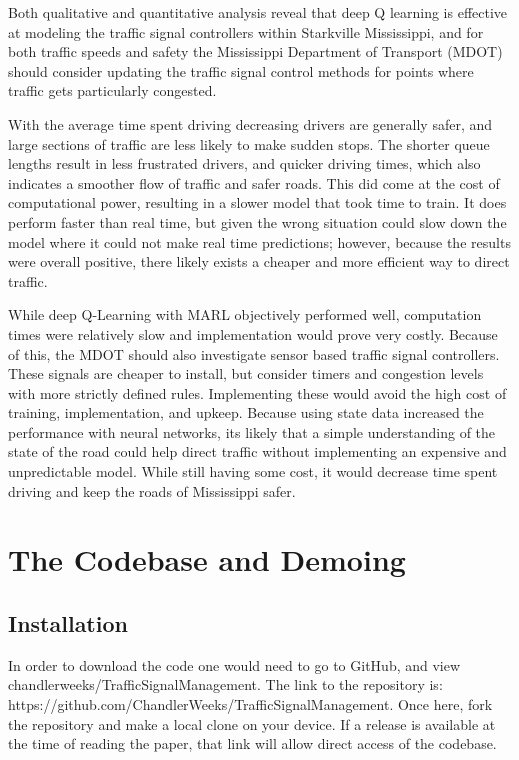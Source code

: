 \documentclass[conference]{IEEEtran}
\begin{document}
Both qualitative and quantitative analysis reveal that deep Q learning is effective at modeling the traffic signal controllers within Starkville Mississippi, and for both traffic speeds and safety the Mississippi Department of Transport (MDOT) should consider updating the traffic signal control methods for points where traffic gets particularly congested. 

With the average time spent driving decreasing drivers are generally safer, and large sections of traffic are less likely to make sudden stops. The shorter queue lengths result in less frustrated drivers, and quicker driving times, which also indicates a smoother flow of traffic and safer roads. This did come at the cost of computational power, resulting in a slower model that took time to train. It does perform faster than real time, but given the wrong situation could slow down the model where it could not make real time predictions; however, because the results were overall positive, there likely exists a cheaper and more efficient way to direct traffic. 

While deep Q-Learning with MARL objectively performed well, computation times were relatively slow and implementation would prove very costly. Because of this, the MDOT should also investigate sensor based traffic signal controllers. These signals are cheaper to install, but consider timers and congestion levels with more strictly defined rules. Implementing these would avoid the high cost of training, implementation, and upkeep. Because using state data increased the performance with neural networks, its likely that a simple understanding of the state of the road could help direct traffic without implementing an expensive and unpredictable model. While still having some cost, it would decrease time spent driving and keep the roads of Mississippi safer. 

\section{The Codebase and Demoing}

\subsection{Installation}

In order to download the code one would need to go to GitHub, and view chandlerweeks/TrafficSignalManagement. The link to the repository is: https://github.com/ChandlerWeeks/TrafficSignalManagement. Once here, fork the repository and make a local clone on your device. If a release is available at the time of reading the paper, that link will allow direct access of the codebase. 
\end{document}
